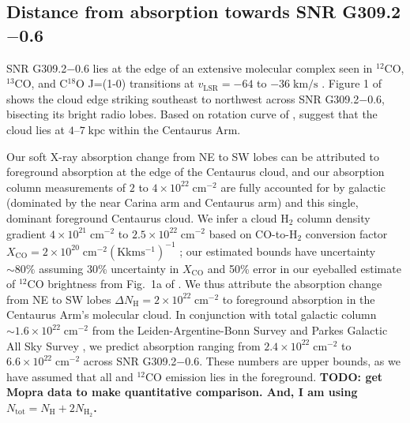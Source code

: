 \documentclass[twocolumn,tighten,trackchanges]{aastex61}
\newcommand*{\mt}{\mathrm}
\newcommand*{\unit}[1]{\;\mt{#1}}  %
\newcommand*{\abt}{\mathord{\sim}} %
\newcommand*{\nH}{N_{\mathrm{H}}}
\newcommand*{\nHUnits}{\times 10^{22} \unit{cm^{-2}}}
\newcommand*{\Gsnr}{G309.2$-$0.6}
\begin{document}
\begin{figure}[]
    \label{fig:fe-bound}
\end{figure}


\subsection{Distance from absorption towards SNR \Gsnr{}} \label{sec:cloud-absorption}

SNR \Gsnr{} lies at the edge of an extensive molecular complex seen in
${}^{12}$CO, ${}^{13}$CO, and C${}^{18}$O J=(1-0) transitions at $v_\mt{LSR} =
-64$ to $-36 \unit{km/s}$ \citep{saito2001}.
Figure 1 of \citet{karr2009} shows the cloud edge striking southeast to
northwest across SNR \Gsnr{}, bisecting its bright radio lobes.
Based on rotation curve of \citet{fich1989}, \citet{saito2001} suggest that the
cloud lies at $4$--$7 \unit{kpc}$ within the Centaurus Arm.

Our soft X-ray absorption change from NE to SW lobes can be attributed to
foreground absorption at the edge of the Centaurus cloud, and our absorption
column measurements of $2$ to $4 \nHUnits$ are fully accounted for by galactic
 (dominated by the near Carina arm and Centaurus arm)
and this single, dominant foreground Centaurus cloud.
We infer a cloud H$_{2}$ column density gradient
$4 \times 10^{21} \unit{cm^{-2}}$ to $2.5 \times 10^{22} \unit{cm^{-2}}$
based on CO-to-H$_{2}$ conversion factor
$X_{\mathrm{CO}} = 2 \times 10^{20} \unit{cm^{-2} (K km s^{-1})^{-1}}$
\citep{bolatto2013};
our estimated bounds have uncertainty $\abt 80\%$ assuming 30\% uncertainty in
$X_{\mathrm{CO}}$ and 50\% error in our eyeballed estimate of ${}^{12}$CO
brightness from Fig.~1a of \citet{saito2001}.
We thus attribute the absorption change from NE to SW lobes
$\Delta \nH = 2 \nHUnits$
to foreground absorption in the Centaurus Arm's molecular cloud.
In conjunction with total galactic  column $\abt 1.6 \nHUnits$
from the Leiden-Argentine-Bonn Survey and Parkes Galactic All Sky Survey
\citep{kalberla2005, mcclure-griffiths2009},
we predict absorption ranging from $2.4 \nHUnits$ to $6.6 \nHUnits$ across SNR
\Gsnr{}.
These numbers are upper bounds, as we have assumed that all  and
${}^{12}$CO emission lies in the foreground.
\textbf{TODO: get Mopra data to make quantitative comparison.  And,
I am using $N_{\mt{tot}} = \nH + 2 N_{\mt{H_{2}}}$.}
\end{document}
